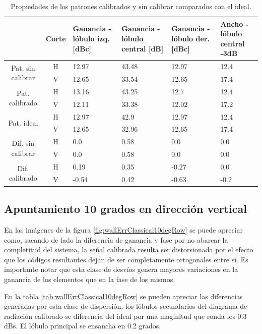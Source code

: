 \begin{table}[H]
  \footnotesize
  \centering
  \begin{tabular}{|c|c|p{2cm}|p{2.5cm}|p{2.5cm}|p{2.5cm}|}
    \cline{2-6}
    \multicolumn{1}{c|}{} & Corte & Ganancia - lóbulo izq. [dBc] & Ganancia - lóbulo central [dB] &
    Ganancia - lóbulo der. [dBc] & Ancho - lóbulo central -3dB \tabularnewline\hline
    \multirow{2}{2cm}{Pat. sin calibrar} & H & 12.97 & 43.48 & 12.97 & 12.4 \tabularnewline\cline{2-6}
     & V & 12.65 & 33.54 & 12.65 & 17.4 \tabularnewline\hline
    \multirow{2}{2cm}{Pat. calibrado} & H & 13.16 & 43.25 & 12.7 & 12.4 \tabularnewline\cline{2-6}
     & V & 12.11 & 33.38 & 12.02 & 17.2 \tabularnewline\hline
    \multirow{2}{2cm}{Pat. ideal} & H & 12.97 & 42.9 & 12.97 & 12.4 \tabularnewline\cline{2-6}
     & V & 12.65 & 32.96 & 12.65 & 17.4 \tabularnewline\hline
    \multirow{2}{2cm}{Dif. sin calibrar} & H & 0.0 & 0.58 & 0.0 & 0.0\tabularnewline\cline{2-6}
     & V & 0.0 & 0.58 & 0.0 & 0.0 \tabularnewline\hline
    \multirow{2}{2cm}{Dif. calibrado} & H & 0.19 & 0.35 & -0.27 & 0.0 \tabularnewline\cline{2-6}
     & V & -0.54 & 0.42 & -0.63 & -0.2 \tabularnewline\hline
  \end{tabular}
  \caption{Propiedades de los patrones calibrados y sin calibrar comparados con el ideal.}
  \label{tab:wallErrClassical10degCol}
\end{table}


\subsection{Apuntamiento 10 grados en dirección vertical}

En las imágenes de la figura \ref{fig:wallErrClassical10degRow} se puede apreciar como, sacando de lado la diferencia de ganancia 
y fase por no abarcar la completitud del sistema, la señal calibrada resulta ser distorsionada por el efecto que los códigos 
resultantes dejan de ser completamente ortogonales entre sí. Es importante notar que esta clase de desvíos genera mayores 
variaciones en la ganancia de los elementos que en la fase de los mismos.

En la tabla \ref{tab:wallErrClassical10degRow} se pueden apreciar las diferencias generadas por esta clase de dispersión, los 
lóbulos secundarios del diagrama de radiación calibrado se diferencia del ideal por una maginitud que ronda los 0.3 dBs. El 
lóbulo principal se ensancha en 0.2 grados.

